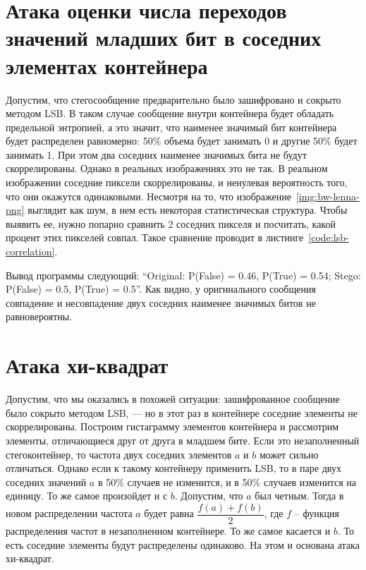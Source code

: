 \section{Атака оценки числа переходов значений младших бит в соседних элементах контейнера}
Допустим, что стегосообщение предварительно было зашифровано и сокрыто методом LSB.
В таком случае сообщение внутри контейнера будет обладать предельной энтропией,
а это значит, что наименее значимый бит контейнера будет распределен равномерно:
50\% объема будет занимать 0 и другие 50\% будет занимать 1. При этом два соседних
наименее значимых бита не будут скоррелированы. Однако в реальных изображениях это не так.
В реальном изображении соседние пиксели скоррелированы, и ненулевая вероятность того,
что они окажутся одинаковыми. Несмотря на то, что изображение~\ref{img:bw-lenna-png}
выглядит как шум, в нем есть некоторая статистическая структура. Чтобы выявить ее,
нужно попарно сравнить 2 соседних пикселя и посчитать, какой процент этих пикселей совпал.
Такое сравнение проводит в листинге~\ref{code:lsb-correlation}.

Вывод программы следующий: ``Original: P(False) = 0.46, P(True) = 0.54; Stego: P(False) = 0.5, P(True) = 0.5''.
Как видно, у оригинального сообщения совпадение и несовпадение двух соседних наименее значимых битов не равновероятны. 

\section{Атака хи-квадрат}
Допустим, что мы оказались в похожей ситуации: зашифрованное сообщение
было сокрыто методом LSB, --- но в этот раз в контейнере соседние элементы не скоррелированы.
Построим гистаграмму элементов контейнера и рассмотрим элементы, отличающиеся друг от друга в младшем бите.
Если это незаполненный стегоконтейнер, то частота двух соседних элементов $a$ и $b$ может сильно отличаться.
Однако если к такому контейнеру применить LSB, то в паре двух соседних значений $a$ в 50\%
случаев не изменится, и в 50\% случаев изменится на единицу. То же самое произойдет и с $b$.
Допустим, что $a$ был четным. Тогда в новом распределении частота $a$ будет равна $\dfrac{ f(a) + f(b)}{2}$,
где $f$ -- функция распределения частот в незаполненном контейнере. То же самое касается и $b$.
То есть соседние элементы будут распределены одинаково. На этом и основана атака хи-квадрат.

